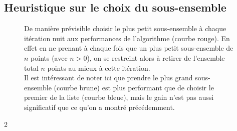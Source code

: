 \documentclass[]{article}
\begin{document}
\begin{multicols}{2}
	\subsection{Heuristique sur le choix du sous-ensemble}\label{heur_choix_du_sous_ens}
	\begin{figure}[H]
		\caption{
			De manière prévisible choisir le plus petit sous-ensemble à chaque itération nuit aux performances de l'algorithme (courbe rouge). En effet en ne prenant à chaque fois que un plus petit sous-ensemble de $n$ points (avec $n > 0$), on se restreint alors à retirer de l'ensemble total $n$ points au mieux à cette itération.\\
			Il est intéressant de noter ici que prendre le plus grand sous-ensemble (courbe brune) est plus performant que de choisir le premier de la liste (courbe bleue), mais le gain n'est pas aussi significatif que ce qu'on a montré précédemment.
		}
	\end{figure}

\end{multicols}{2}
\end{document}
